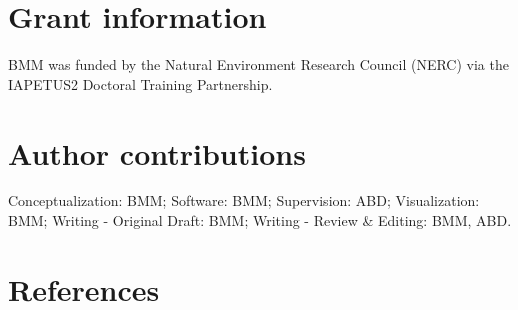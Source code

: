 \documentclass[10pt,a4paper]{article}
\begin{document}
\section{Grant information}\label{grant-information}

BMM was funded by the Natural Environment Research Council (NERC) via the IAPETUS2 Doctoral Training Partnership.

\section{Author contributions}\label{author-contributions}

Conceptualization: BMM;
Software: BMM;
Supervision: ABD;
Visualization: BMM;
Writing - Original Draft: BMM;
Writing - Review \& Editing: BMM, ABD.

\clearpage

\section*{References}\label{references}
\end{document}

